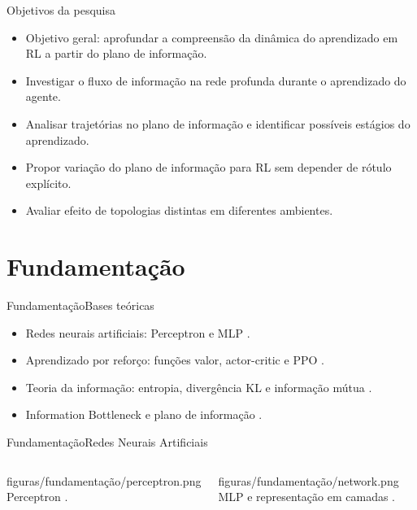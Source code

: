 \documentclass[
11pt,notheorems,hyperref={pdfauthor=Autor}
]{beamer}
\begin{document}
\begin{frame}{Objetivos da pesquisa}
\begin{itemize}
    \item Objetivo geral: aprofundar a compreensão da dinâmica do aprendizado em RL a partir do plano de informação.
    \item Investigar o fluxo de informação na rede profunda durante o aprendizado do agente.
    \item Analisar trajetórias no plano de informação e identificar possíveis estágios do aprendizado.
    \item Propor variação do plano de informação para RL sem depender de rótulo explícito.
    \item Avaliar efeito de topologias distintas em diferentes ambientes.
\end{itemize}
\end{frame}

\section{Fundamentação}
\begin{frame}{Fundamentação}{Bases teóricas}
\begin{itemize}
    \item Redes neurais artificiais: Perceptron e MLP \parencite{haykin2009neural}.
    \item Aprendizado por reforço: funções valor, actor-critic e PPO \parencite{russell2010artificial,sutton1998reinforcement,schulman2017proximal}.
    \item Teoria da informação: entropia, divergência KL e informação mútua \parencite{cover2006elements}.
    \item Information Bottleneck e plano de informação \parencite{tishby2015deep,shwartz2017opening}.
\end{itemize}
\end{frame}

\begin{frame}{Fundamentação}{Redes Neurais Artificiais}
\begin{columns}[T,onlytextwidth]
    \FigureWithFallbackCaption
    {figuras/fundamentação/perceptron.png}
    {Perceptron \parencite{haykin2009neural}.}

    \FigureWithFallbackCaption
    {figuras/fundamentação/network.png}
    {MLP e representação em camadas \parencite{haykin2009neural}.}
\end{columns}
\end{frame}
\end{document}
